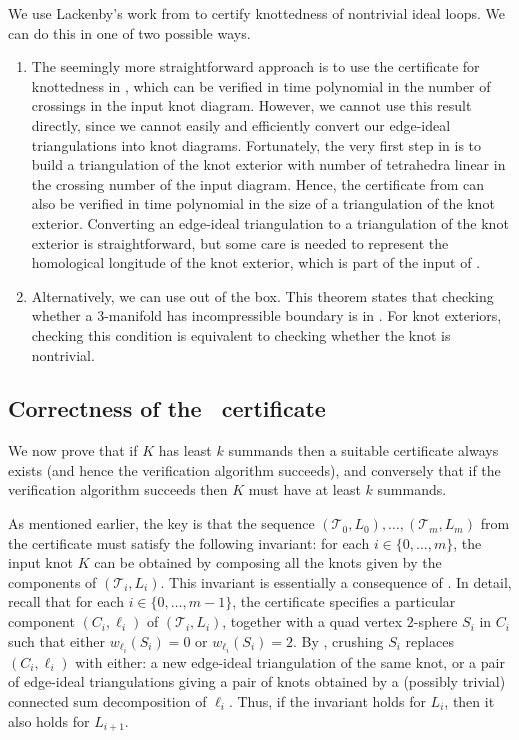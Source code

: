 \documentclass[a4paper,UKenglish,cleveref, autoref, thm-restate]{lipics-v2021}
\newcommand{\tri}{\mathcal{T}}
\begin{document}
We use Lackenby's work from \cite{lackenby2016efficient} to certify knottedness of nontrivial ideal loops. We can do this in one of two possible ways.
%
\begin{enumerate}
    \item The seemingly more straightforward approach is to use the certificate for knottedness in \cite[Theorems~1.1 and~1.5]{lackenby2016efficient},
    which can be verified in time polynomial in the number of crossings in the input knot diagram.
    However, we cannot use this result directly, since we cannot easily and efficiently convert our edge-ideal triangulations into knot diagrams.
    Fortunately, the very first step in \cite{lackenby2016efficient} is to build a triangulation of the knot exterior with number of tetrahedra linear in the crossing number of the input diagram.
    Hence, the certificate from \cite{lackenby2016efficient} can also be verified in time polynomial in the size of a triangulation of the knot exterior.
    Converting an edge-ideal triangulation to a triangulation of the knot exterior is straightforward,
    but some care is needed to represent the homological longitude of the knot exterior, which is part of the input of \cite[Theorem~1.5]{lackenby2016efficient}.
    \item Alternatively, we can use \cite[Theorem~1.7]{lackenby2016efficient} out of the box.
    This theorem states that checking whether a $3$-manifold has incompressible boundary is in {\NP}.
    For knot exteriors, checking this condition is equivalent to checking whether the knot is nontrivial.
\end{enumerate}

\subsection{Correctness of the \NP\ certificate}\label{ssec:proofNP}

We now prove that if $K$ has least $k$ summands then a suitable certificate always exists (and hence the verification algorithm succeeds),
and conversely that if the verification algorithm succeeds then $K$ must have at least $k$ summands.

As mentioned earlier, the key is that the sequence $(\tri_0,L_0),\ldots,(\tri_m,L_m)$ from the certificate must satisfy the following invariant:
for each $i\in \{0,\ldots,m\}$, the input knot $K$ can be obtained by composing all the knots given by the components of $(\tri_i,L_i)$.
This invariant is essentially a consequence of .
In detail, recall that for each $i\in \{0,\ldots,m-1\}$, the certificate specifies a particular component $(C_i,\ell_i)$ of $(\tri_i,L_i)$,
together with a quad vertex $2$-sphere $S_i$ in $C_i$ such that either $w_{\ell_i}(S_i)=0$ or $w_{\ell_i}(S_i)=2$.
By , crushing $S_i$ replaces $(C_i,\ell_i)$ with either:
a new edge-ideal triangulation of the same knot, or a pair of edge-ideal triangulations giving a pair of knots obtained by a (possibly trivial) connected sum decomposition of $\ell_i$.
Thus, if the invariant holds for $L_i$, then it also holds for $L_{i+1}$.
\end{document}
